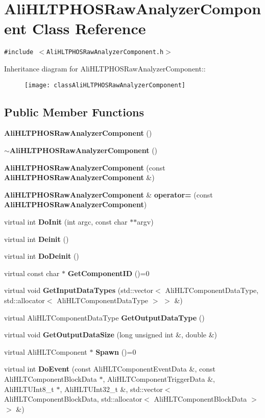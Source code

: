 \section{Ali\-HLTPHOSRaw\-Analyzer\-Component Class Reference}
\label{classAliHLTPHOSRawAnalyzerComponent}
{\tt \#include $<$Ali\-HLTPHOSRaw\-Analyzer\-Component.h$>$}

Inheritance diagram for Ali\-HLTPHOSRaw\-Analyzer\-Component::\begin{figure}[H]
\begin{center}
\leavevmode
\texttt{[image: classAliHLTPHOSRawAnalyzerComponent]}
\end{center}
\end{figure}
\subsection*{Public Member Functions}
\begin{CompactItemize}
\item 
{\bf Ali\-HLTPHOSRaw\-Analyzer\-Component} ()
\item 
{\bf $\sim$Ali\-HLTPHOSRaw\-Analyzer\-Component} ()
\item 
{\bf Ali\-HLTPHOSRaw\-Analyzer\-Component} (const {\bf Ali\-HLTPHOSRaw\-Analyzer\-Component} \&)
\item 
{\bf Ali\-HLTPHOSRaw\-Analyzer\-Component} \& {\bf operator=} (const {\bf Ali\-HLTPHOSRaw\-Analyzer\-Component})
\item 
virtual int {\bf Do\-Init} (int argc, const char $\ast$$\ast$argv)
\item 
virtual int {\bf Deinit} ()
\item 
virtual int {\bf Do\-Deinit} ()
\item 
virtual const char $\ast$ {\bf Get\-Component\-ID} ()=0
\item 
virtual void {\bf Get\-Input\-Data\-Types} (std::vector$<$ Ali\-HLTComponent\-Data\-Type, std::allocator$<$ Ali\-HLTComponent\-Data\-Type $>$ $>$ \&)
\item 
virtual Ali\-HLTComponent\-Data\-Type {\bf Get\-Output\-Data\-Type} ()
\item 
virtual void {\bf Get\-Output\-Data\-Size} (long unsigned int \&, double \&)
\item 
virtual Ali\-HLTComponent $\ast$ {\bf Spawn} ()=0
\item 
virtual int {\bf Do\-Event} (const Ali\-HLTComponent\-Event\-Data \&, const Ali\-HLTComponent\-Block\-Data $\ast$, Ali\-HLTComponent\-Trigger\-Data \&, Ali\-HLTUInt8\_\-t $\ast$, Ali\-HLTUInt32\_\-t \&, std::vector$<$ Ali\-HLTComponent\-Block\-Data, std::allocator$<$ Ali\-HLTComponent\-Block\-Data $>$ $>$ \&)
\end{CompactItemize}
